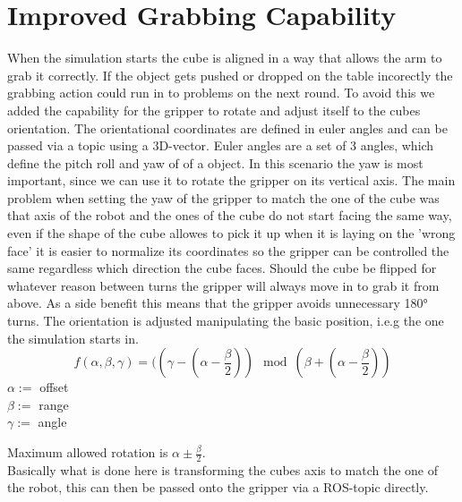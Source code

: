 \documentclass[report]{iisthesis}
\begin{document}
\section{Improved Grabbing Capability}
When the simulation starts the cube is aligned in a way that allows the arm to grab it correctly. If the object gets pushed or dropped on the table incorectly the grabbing action could run in to problems
on the next round. To avoid this we added the capability for the gripper to rotate and adjust itself to the cubes orientation.
The orientational coordinates are defined in euler angles and can be passed via a topic using a 3D-vector.
Euler angles are a set of 3 angles, which define the pitch roll and yaw of of a object. In this scenario the yaw is most important, since we can use it to rotate the gripper on its vertical axis.
The main problem when setting the yaw of the gripper to match the one of the cube was that axis of the robot and the ones of the cube do not start facing the same way, even if the shape of the cube allowes 
to pick it up when it is laying on the 'wrong face' it is easier to normalize its coordinates so the gripper can be controlled the same regardless which direction the cube faces. 
Should the cube be flipped for whatever reason between turns the gripper will always move in to grab it from above.
As a side benefit this means that the gripper avoids unnecessary 180° turns.
The orientation is adjusted manipulating the basic position, i.e.g the one the simulation starts in.
$$
f(\alpha, \beta, \gamma) = ((\gamma - (\alpha - \frac{\beta}{2})) \mod (\beta + (\alpha - \frac{\beta}{2}))
$$
$\alpha :=$ offset \\
$\beta :=$ range\\
$\gamma :=$ angle

Maximum allowed rotation is $\alpha \pm \frac{\beta}{2}$. \\
Basically what is done here is transforming the cubes axis to match the one of the robot, this can then be passed onto the gripper via a ROS-topic directly.

\setcounter{chapter}{3}
\setcounter{section}{0}
\end{document}
